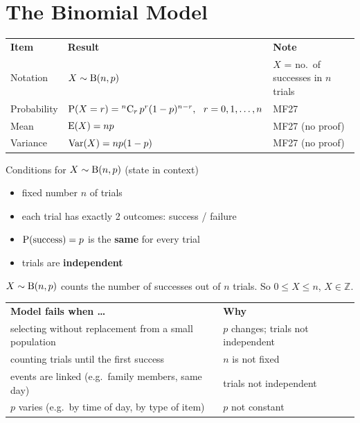 \clearpage
{}
\section{The Binomial Model}
\begin{center}\ba\small
\begin{tabular}{|M{3.6cm}|M{6.6cm}|L{5.0cm}|}\hline
\textbf{Item} & \textbf{Result} & \textbf{Note}\\\Xhline{2pt}
Notation & $X\sim\mathrm{B}(n,p)$ & $X$ = no.\ of successes in $n$ trials\\\hline
Probability & $\Pp{X=r}=\nCr{n}{r}\,p^{r}(1-p)^{n-r},\ \ r=0,1,\dots,n$ & MF27\\\hline
Mean & $\mathrm{E}(X)=np$ & MF27 (no proof)\\\hline
Variance & $\mathrm{Var}(X)=np(1-p)$ & MF27 (no proof)\\\hline
\end{tabular}\end{center}
\begin{theorem}[before skip=2mm,after skip=3mm]{Conditions for $X\sim\mathrm{B}(n,p)$ (state in context)}
\begin{itemize}[leftmargin=*,itemsep=1pt,topsep=1pt,parsep=0pt]
\item fixed number $n$ of trials
\item each trial has exactly 2 outcomes: success / failure
\item $\mathrm{P}(\text{success})=p$ is the \textbf{same} for every trial
\item trials are \textbf{independent}
\end{itemize}
\end{theorem}
\begin{info}[title=Note]
$X\sim\mathrm{B}(n,p)$ counts the number of successes out of $n$ trials. So $0\leqslant X\leqslant n$, $X\in\mathbb{Z}$.
\end{info}
\begin{center}\ba\small
\begin{tabular}{|L{7.0cm}|L{8.2cm}|}\hline
\textbf{Model fails when \ldots} & \textbf{Why}\\\Xhline{2pt}
selecting without replacement from a small population & $p$ changes; trials not independent\\\hline
counting trials until the first success & $n$ is not fixed\\\hline
events are linked (e.g.\ family members, same day) & trials not independent\\\hline
$p$ varies (e.g.\ by time of day, by type of item) & $p$ not constant\\\hline
\end{tabular}\end{center}
